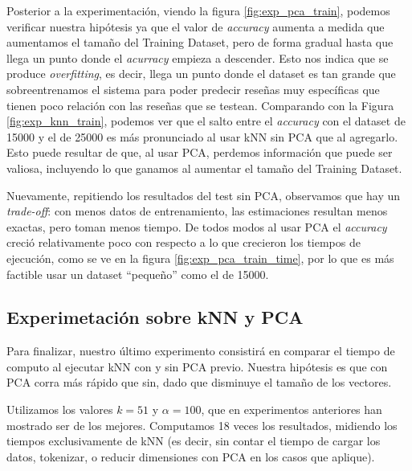 Posterior a la experimentación, viendo la figura \ref{fig:exp_pca_train}, podemos verificar nuestra hipótesis ya que el
valor de \textit{accuracy} aumenta a medida que aumentamos el tamaño del
Training Dataset, pero de forma gradual hasta que llega un punto donde el \textit{acurracy} empieza a descender. Esto nos indica que se produce \textit{overfitting}, es decir, llega un punto donde el dataset es tan grande que sobreentrenamos el sistema para poder predecir reseñas muy específicas que tienen poco relación con las reseñas que se testean.
Comparando con la Figura \ref{fig:exp_knn_train}, podemos ver que
el salto entre el \textit{accuracy} con el dataset de 15000 y el de 25000
es más pronunciado al usar kNN sin PCA que al agregarlo. Esto puede resultar de
que, al usar PCA, perdemos información que puede ser valiosa, incluyendo lo que
ganamos al aumentar el tamaño del Training Dataset.

Nuevamente, repitiendo los resultados del test sin PCA, observamos que hay un
\textit{trade-off}: con menos datos de entrenamiento,
las estimaciones resultan menos exactas, pero toman menos tiempo. De todos modos
al usar PCA el \textit{accuracy} creció relativamente poco con respecto a lo que
crecieron los tiempos de ejecución, como se ve en la figura \ref{fig:exp_pca_train_time}, por lo que es más factible usar un
dataset ``pequeño'' como el de 15000.

\subsection{Experimetación sobre kNN y PCA}
Para finalizar, nuestro último experimento consistirá en comparar el
tiempo de computo al ejecutar kNN con y sin PCA previo.
Nuestra hipótesis es que con PCA corra más rápido que sin, dado que disminuye
el tamaño de los vectores.

Utilizamos los valores $k = 51$ y $\alpha = 100$, que en experimentos
anteriores han mostrado ser de los mejores. Computamos 18 veces los resultados,
midiendo los tiempos exclusivamente de kNN (es decir, sin contar el tiempo
de cargar los datos, tokenizar, o reducir dimensiones con PCA
en los casos que aplique).

